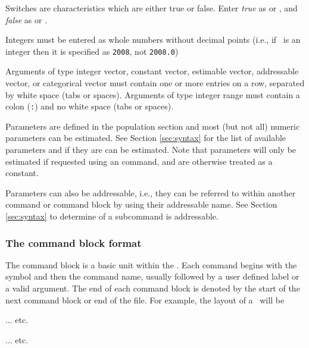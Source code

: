 Switches are characteristics which are either true or false. Enter \emph{true} as  or , and \emph{false} as  or .

Integers must be entered as whole numbers without decimal points (i.e., if \ is an integer then it is specified as \texttt{2008}, not \texttt{2008.0})

Arguments of type integer vector, constant vector, estimable vector, addressable vector, or categorical vector must contain one or more entries on a row, separated by white space (tabs or spaces). Arguments of type integer range must contain a colon (\texttt{:}) and no white space (tabs or spaces).

Parameters are defined in the population section and most (but not all) numeric parameters can be estimated. See Section \ref{sec:syntax} for the list of available parameters and if they are can be estimated. Note that parameters will only be estimated if requested using an  command, and are otherwise treated as a constant.

Parameters can also be addressable, i.e., they can be referred to within another command or command block by using their addressable name. See Section \ref{sec:syntax} to determine of a subcommand is addressable.

\subsubsection{The command block format}\label{sec:CommandBlockFormat}

The command block is a basic unit within the \config. Each command begins with the symbol \command{} and then the command name, usually followed by a user defined label or a valid argument. The end of each command block is denoted by the start of the next command block or end of the file. For example, the layout of a \config\ will be

\begin{description}
	\item {} 
	\item {} 
	\item {} 
	\item ... etc.
	\item {} 
	\item {} 
	\item {} 
	\item ... etc.
\end{description}

